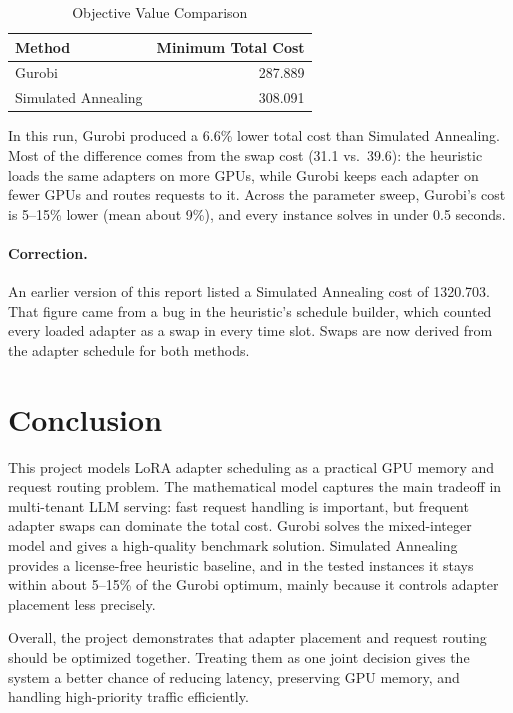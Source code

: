 \documentclass[12pt]{article}
\begin{document}
\begin{table}[h]
\centering
\caption{Objective Value Comparison}
\begin{tabular}{lr}
\toprule
Method & Minimum Total Cost \\
\midrule
Gurobi & 287.889 \\
Simulated Annealing & 308.091 \\
\bottomrule
\end{tabular}
\end{table}

In this run, Gurobi produced a 6.6\% lower total cost than Simulated Annealing.
Most of the difference comes from the swap cost (31.1 vs.\ 39.6): the heuristic
loads the same adapters on more GPUs, while Gurobi keeps each adapter on fewer
GPUs and routes requests to it. Across the parameter sweep, Gurobi's cost is
5--15\% lower (mean about 9\%), and every instance solves in under 0.5 seconds.

\paragraph{Correction.} An earlier version of this report listed a Simulated
Annealing cost of 1320.703. That figure came from a bug in the heuristic's
schedule builder, which counted every loaded adapter as a swap in every time
slot. Swaps are now derived from the adapter schedule for both methods.

\section{Conclusion}

This project models LoRA adapter scheduling as a practical GPU memory and
request routing problem. The mathematical model captures the main tradeoff in
multi-tenant LLM serving: fast request handling is important, but frequent
adapter swaps can dominate the total cost. Gurobi solves the mixed-integer model
and gives a high-quality benchmark solution. Simulated Annealing provides a
license-free heuristic baseline, and in the tested instances it stays within about 5--15\% of the
Gurobi optimum, mainly because it controls adapter placement less precisely.

Overall, the project demonstrates that adapter placement and request routing
should be optimized together. Treating them as one joint decision gives the
system a better chance of reducing latency, preserving GPU memory, and handling
high-priority traffic efficiently.
\end{document}
